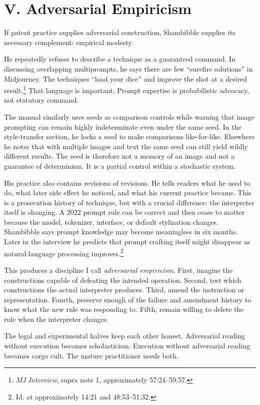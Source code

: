 \documentclass[11pt]{article}
\begin{document}
\section*{V. Adversarial Empiricism}
If patent practice supplies adversarial construction, Shambibble supplies its necessary complement: empirical modesty.

He repeatedly refuses to describe a technique as a guaranteed command. In discussing overlapping multiprompts, he says there are few ``surefire solutions'' in Midjourney. The techniques ``load your dice'' and improve the shot at a desired result.\footnote{\emph{MJ Interview}, supra note 1, approximately 57:24--59:57.} That language is important. Prompt expertise is probabilistic advocacy, not statutory command.

The manual similarly uses seeds as comparison controls while warning that image prompting can remain highly indeterminate even under the same seed. In the style-transfer section, he locks a seed to make comparisons like-for-like. Elsewhere he notes that with multiple images and text the same seed can still yield wildly different results. The seed is therefore not a memory of an image and not a guarantee of determinism. It is a partial control within a stochastic system.

His practice also contains revisions of revisions. He tells readers what he used to do, what later side effect he noticed, and what his current practice became. This is a prosecution history of technique, but with a crucial difference: the interpreter itself is changing. A 2022 prompt rule can be correct and then cease to matter because the model, tokenizer, interface, or default stylization changes. Shambibble says prompt knowledge may become meaningless in six months. Later in the interview he predicts that prompt crafting itself might disappear as natural-language processing improves.\footnote{Id. at approximately 14:21 and 48:53--51:32.}

This produces a discipline I call \emph{adversarial empiricism}. First, imagine the constructions capable of defeating the intended operation. Second, test which constructions the actual interpreter produces. Third, amend the instruction or representation. Fourth, preserve enough of the failure and amendment history to know what the new rule was responding to. Fifth, remain willing to delete the rule when the interpreter changes.

The legal and experimental halves keep each other honest. Adversarial reading without execution becomes scholasticism. Execution without adversarial reading becomes cargo cult. The mature practitioner needs both.
\end{document}
